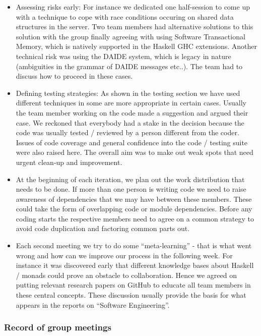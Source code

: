 \documentclass[11pt]{article}
\begin{document}
\begin{itemize}
\item Assessing risks early: For instance we dedicated one half-session to 
      come up with a technique to cope with race conditions occuring on shared
      data structures in the server. Two team members had alternative solutions
      to this solution with the group finally agreeing with using Software
      Transactional Memory, which is natively supported in the Haskell GHC
      extensions. Another technical risk was using the DAIDE system, which is 
      legacy in nature (ambiguities in the grammar of DAIDE messages etc..). The
      team had to discuss how to proceed in these cases.
\item Defining testing strategies: As shown in the testing section we have used
      different techniques in some are more appropriate in certain cases. Usually
      the team member working on the code made a suggestion and argued their case.
      We reckoned that everybody had a stake in the decision because the code was 
      usually tested / reviewed by a person different from the coder. Issues of
      code coverage and general confidence into the code / testing suite were 
      also raised here. The overall aim was to make out weak spots that need
      urgent clean-up and improvement.
\item At the beginning of each iteration, we plan out the work distribution that needs
      to be done. If more than one person is writing code we need to raise awareness 
      of dependencies that we may have between these members. These could take the
      form of overlapping code or module dependencies. Before any coding starts
      the respective members need to agree on a common strategy to avoid code duplication
      and factoring common parts out.
\item Each second meeting we try to do some ``meta-learning'' - that is what went wrong
      and how can we improve our process in the following week. For instance it was 
      discovered early that different knowledge bases about Haskell / monads could
      prove an obstacle to collaboration. Hence we agreed on putting relevant research
      papers on GitHub to educate all team members in these central concepts. These
      discussion usually provide the basis for what appears in the reports on 
      ``Software Engineering''.

\end{itemize}


\subsubsection{Record of group meetings}
\end{document}
